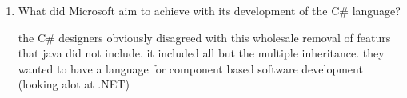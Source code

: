 \begin{enumerate}
  \item What did Microsoft aim to achieve with its development of the
    C\# language?

  \begin{answer}

   the C# designers obviously disagreed with this wholesale removal of featurs that java
   did not include. it included all but the multiple inheritance. they wanted to have a 
   language for component based software development (looking alot at .NET)


    \end{answer}

  \end{enumerate}


